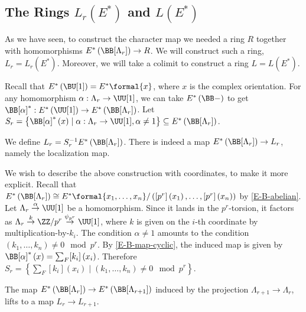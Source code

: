 \subsection{The Rings \texorpdfstring{$L_r\left(E^*\right)$}{Lr(E*)} and \texorpdfstring{$L\left(E^*\right)$}{L(E*)}}

As we have seen, to construct the character map we needed a ring $R$ together with homomorphisms $E^*\left(\BB[\Lambda_r]\right) \to R$.
We will construct such a ring, $L_r = L_r\left(E^*\right)$.
Moreover, we will take a colimit to construct a ring $L = L\left(E^*\right)$.

Recall that $E^*\left(\BU[1]\right) = E^*\formal{x}$, where $x$ is the complex orientation.
For any homomorphism $\alpha: \Lambda_r \to \UU[1]$, we can take $E^*\left(\BB-\right)$ to get $\BB[\alpha]^*: E^*\left(\UU[1]\right) \to E^*\left(\BB[\Lambda_r]\right)$.
Let $S_r = \left\{ \BB[\alpha]^*\left(x\right) \mid \alpha: \Lambda_r \to \UU[1], \alpha \neq 1 \right\} \subseteq E^*\left(\BB[\Lambda_r]\right)$.

\begin{definition}\label{Lr}
	We define $L_r = S_r^{-1} E^*\left(\BB[\Lambda_r]\right)$.
	There is indeed a map $E^*\left(\BB[\Lambda_r]\right) \to L_r$, namely the localization map.
\end{definition}

We wish to describe the above construction with coordinates, to make it more explicit.
Recall that $E^*\left(\BB[\Lambda_r]\right) \cong E^*\formal{x_1, \dotsc, x_n}/\left(\left[p^r\right]\left(x_1\right), \dotsc, \left[p^r\right]\left(x_n\right)\right)$ by \ref{E-B-abelian}.
Let $\Lambda_r \overset{\alpha}{\to} \UU[1]$ be a homomorphism.
Since it lands in the $p^r$-torsion, it factors as $\Lambda_r \overset{k}{\to} \ZZ/{p^r} \overset{\psi_{p^r}}{\to} \UU[1]$, where $k$ is given on the $i$-th coordinate by multiplication-by-$k_i$.
The condition $\alpha \neq 1$ amounts to the condition $\left(k_1, \dotsc, k_n\right) \neq 0 \mod p^r$.
By \ref{E-B-map-cyclic}, the induced map is given by $\BB[\alpha]^*\left(x\right) = \sum_F [k_i]\left(x_i\right)$.
Therefore $S_r = \left\{ \sum_F [k_i]\left(x_i\right) \mid \left(k_1, \dotsc, k_n\right) \neq 0 \mod p^r\right\}$.

\begin{proposition}
	The map $E^*\left(\BB[\Lambda_r]\right) \to E^*\left(\BB[\Lambda_{r+1}]\right)$ induced by the projection $\Lambda_{r+1} \to \Lambda_r$, lifts to a map $L_r \to L_{r+1}$.
\end{proposition}

